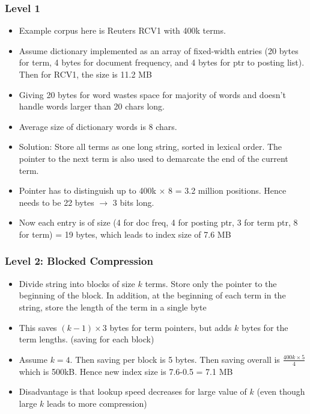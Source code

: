 \documentclass{article}
\begin{document}
\subsubsection{Level 1}
\begin{itemize}
    \item Example corpus here is Reuters RCV1 with 400k terms. 
    \item Assume dictionary implemented as an array of fixed-width entries (20 bytes for term, 4 bytes for document frequency, and 4 bytes for ptr to posting list). Then for RCV1, the size is 11.2 MB
    
    \item Giving 20 bytes for word wastes space for majority of words and doesn't handle words larger than 20 chars long. 
    
    \item Average size of dictionary words is 8 chars. 
    
    \item Solution: Store all terms as one long string, sorted in lexical order. The pointer to the next term is also used to demarcate the end of the current term.
    
    \item Pointer has to distinguish up to 400k $\times$ 8 = 3.2 million positions. Hence needs to be 22 bytes $\rightarrow$ 3 bits long. 
    
    \item Now each entry is of size (4 for doc freq, 4 for posting ptr, 3 for term ptr, 8 for term) = 19 bytes, which leads to index size of 7.6 MB
\end{itemize}

\subsubsection{Level 2: Blocked Compression}
\begin{itemize}
    \item Divide string into blocks of size $k$ terms. Store only the pointer to the beginning of the block. In addition, at the beginning of each term in the string, store the length of the term in a single byte
    
    \item This saves $(k-1)\times 3$ bytes for term pointers, but adds $k$ bytes for the term lengths. (saving for each block)
    
    \item Assume $k=4$. Then saving per block is 5 bytes. Then saving overall is $\frac{400k \times 5}{4}$ which is 500kB. Hence new index size is 7.6-0.5 = 7.1 MB
    
    \item Disadvantage is that lookup speed decreases for large value of $k$ (even though large $k$ leads to more compression)
\end{itemize}
\end{document}
